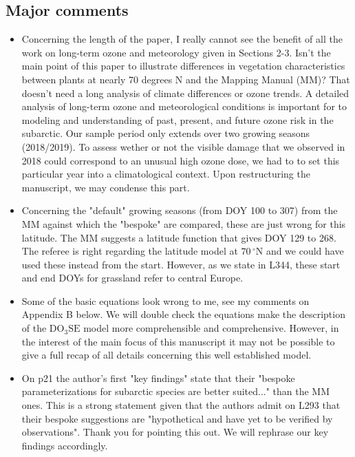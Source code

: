 \documentclass{scrartcl}
\begin{document}
\subsection*{Major comments} 
\begin{itemize}
    
    \item {\color{blue}Concerning the length of the paper, I really cannot see the benefit of all the work on long-term ozone and meteorology given in Sections 2-3. Isn't the main point of this paper to illustrate differences in vegetation characteristics between plants at nearly 70 degrees N and the Mapping Manual (MM)? That doesn't need a long analysis of climate differences or ozone trends.} A detailed analysis of long-term ozone and meteorological conditions is important for to modeling and understanding of past, present, and future ozone risk in the subarctic. Our sample period only extends over two growing seasons (2018/2019). To assess wether or not the visible damage that we observed in 2018 could correspond to an unusual high ozone dose, we had to to set this particular year into a climatological context. Upon restructuring the manuscript, we may condense this part.
    
    \item {\color{blue}Concerning the "default" growing seasons (from DOY 100 to 307) from the MM against which the "bespoke" are compared, these are just wrong for this latitude. The MM suggests a latitude function that gives DOY 129 to 268.} The referee is right regarding the latitude model at $70\,^\circ$N and we could have used these instead from the start. However, as we state in L344, these start and end DOYs for grassland refer to central Europe.
    
    \item {\color{blue}Some of the basic equations look wrong to me, see my comments on Appendix B below.} We will double check the equations make the description of the $\mathrm{DO_3SE}$ model more comprehensible and comprehensive. However, in the interest of the main focus of this manuscript it may not be possible to give a full recap of all details concerning this well established model.
    
    \item {\color{blue}On p21 the author's first "key findings" state that their "bespoke parameterizations for subarctic species are better suited..." than the MM ones. This is a strong statement given that the authors admit on L293 that their bespoke suggestions are "hypothetical and have yet to be verified by observations".} Thank you for pointing this out. We will rephrase our key findings accordingly.

\end{itemize}
\end{document}
